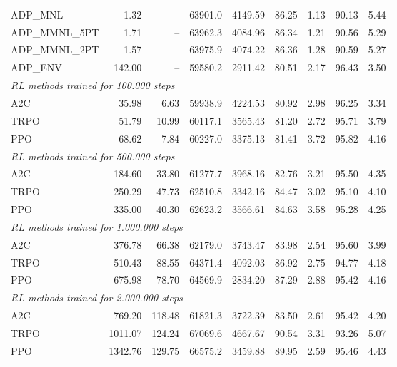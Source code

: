 \begin{samepage}
\begin{center}
\begin{tabular}{l|rr|rr|rr|rr}
    \midrule
    ADP\_MNL     &     1.32 &    -- &    63901.0 &    4149.59 &   86.25 &    1.13 &   90.13 &    5.44 \\
    ADP\_MMNL\_5PT &     1.71 &    -- &    63962.3 &    4084.96 &   86.34 &    1.21 &   90.56 &    5.29 \\
    ADP\_MMNL\_2PT &     1.57 &    -- &    63975.9 &    4074.22 &   86.36 &    1.28 &   90.59 &    5.27 \\
    ADP\_ENV     &   142.00 &    -- &    59580.2 &    2911.42 &   80.51 &    2.17 &   96.43 &    3.50 \\
    \midrule
    \multicolumn{9}{l}{\textit{RL methods trained for 100.000 steps}} \\
    \midrule
    A2C          &    35.98 &     6.63 &    59938.9 &    4224.53 &   80.92 &    2.98 &   96.25 &    3.34 \\
    TRPO         &    51.79 &    10.99 &    60117.1 &    3565.43 &   81.20 &    2.72 &   95.71 &    3.79 \\
    PPO          &    68.62 &     7.84 &    60227.0 &    3375.13 &   81.41 &    3.72 &   95.82 &    4.16 \\
    \midrule
    \multicolumn{9}{l}{\textit{RL methods trained for 500.000 steps}} \\
    \midrule
    A2C          &   184.60 &    33.80 &    61277.7 &    3968.16 &   82.76 &    3.21 &   95.50 &    4.35 \\
    TRPO         &   250.29 &    47.73 &    62510.8 &    3342.16 &   84.47 &    3.02 &   95.10 &    4.10 \\
    PPO          &   335.00 &    40.30 &    62623.2 &    3566.61 &   84.63 &    3.58 &   95.28 &    4.25 \\
    \midrule
    \multicolumn{9}{l}{\textit{RL methods trained for 1.000.000 steps}} \\
    \midrule
    A2C          &   376.78 &    66.38 &    62179.0 &    3743.47 &   83.98 &    2.54 &   95.60 &    3.99 \\
    TRPO         &   510.43 &    88.55 &    64371.4 &    4092.03 &   86.92 &    2.75 &   94.77 &    4.18 \\
    PPO          &   675.98 &    78.70 &    64569.9 &    2834.20 &   87.29 &    2.88 &   95.42 &    4.16 \\
    \midrule
    \multicolumn{9}{l}{\textit{RL methods trained for 2.000.000 steps}} \\
    \midrule
    A2C          &   769.20 &   118.48 &    61821.3 &    3722.39 &   83.50 &    2.61 &   95.42 &    4.20 \\
    TRPO         &  1011.07 &   124.24 &    67069.6 &    4667.67 &   90.54 &    3.31 &   93.26 &    5.07 \\
    PPO          &  1342.76 &   129.75 &    66575.2 &    3459.88 &   89.95 &    2.59 &   95.46 &    4.43 \\
    \bottomrule
  \end{tabular}
\end{center}
\end{samepage}

